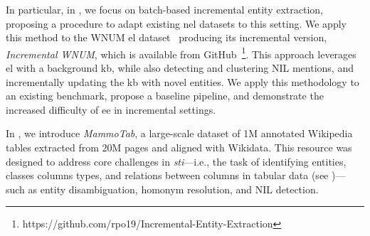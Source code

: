 


In particular, in \textcite{ijckg2022}, we focus on batch-based incremental entity extraction, proposing a procedure to adapt existing \ac{nel} datasets to this setting. We apply this method to the WNUM \ac{el} dataset~\cite{Onoe_Durrett_2020} producing its incremental version, \emph{Incremental WNUM}, which is available from GitHub~\footnote{https://github.com/rpo19/Incremental-Entity-Extraction}. This approach leverages \ac{el} with a background \ac{kb}, while also detecting and clustering NIL mentions, and incrementally updating the \ac{kb} with novel entities. We apply this methodology to an existing benchmark, propose a baseline pipeline, and demonstrate the increased difficulty of \acl{ee} in incremental settings.

In \textcite{mammotab}, we introduce \emph{MammoTab}, a large-scale dataset of 1M annotated Wikipedia tables extracted from 20M pages and aligned with Wikidata. This resource was designed to address core challenges in \emph{\acf{sti}}---i.e., the task of identifying entities, classes columns types, and relations between columns in tabular data (see )---such as entity disambiguation, homonym resolution, and NIL detection.


